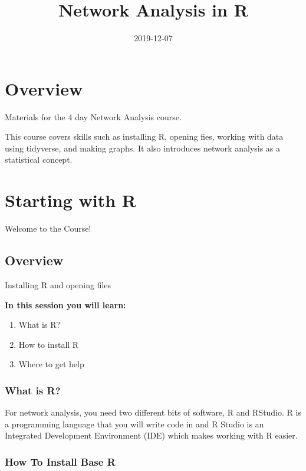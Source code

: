 \documentclass[]{book}
\title{Network Analysis in R}
\author{}
\date{2019-12-07}
\providecommand{\tightlist}{%
  \setlength{\itemsep}{0pt}\setlength{\parskip}{0pt}}
\begin{document}
\maketitle

{
\setcounter{tocdepth}{1}
\tableofcontents
}
\hypertarget{overview}{%
\chapter*{Overview}\label{overview}}

Materials for the 4 day Network Analysis course.

This course covers skills such as installing R, opening fies, working with data using tidyverse, and making graphs. It also introduces network analysis as a statistical concept.

\hypertarget{starting-with-r}{%
\chapter{Starting with R}\label{starting-with-r}}

{Welcome to the Course!}

\hypertarget{overview-1}{%
\section{Overview}\label{overview-1}}

Installing R and opening files

\textbf{In this session you will learn:}

\begin{enumerate}
\def\labelenumi{\arabic{enumi}.}
\tightlist
\item
  What is R?
\item
  How to install R
\item
  Where to get help
\end{enumerate}

\hypertarget{what-is-r}{%
\subsection{What is R?}\label{what-is-r}}

For network analysis, you need two different bits of software, R and RStudio. R is a programming language that you will write code in and R Studio is an Integrated Development Environment (IDE) which makes working with R easier.

\hypertarget{how-to-install-base-r}{%
\subsection{How To Install Base R}\label{how-to-install-base-r}}
\end{document}
